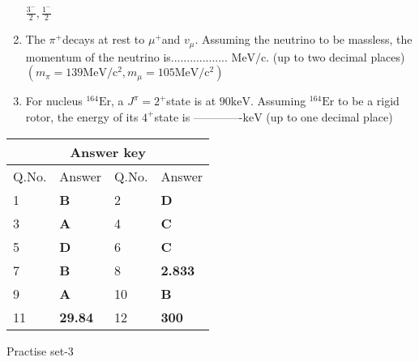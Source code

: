 \begin{enumerate}
\begin{tasks}
		\task[\textbf{D.}] $\frac{3^{-}}{2}, \frac{1^{-}}{2}$
	\end{tasks}
	\item The $\pi^{+}$decays at rest to $\mu^{+}$and $v_{\mu}$. Assuming the neutrino to be massless, the momentum of the neutrino is.................. $\mathrm{MeV} / \mathrm{c}$. (up to two decimal places)\\ $\left(m_{\pi}=139 \mathrm{MeV} / \mathrm{c}^{2}, m_{\mu}=105 \mathrm{MeV} / \mathrm{c}^{2}\right)$
	{}
	\item For nucleus ${ }^{164} \mathrm{Er}$, a $J^{\pi}=2^{+}$state is at $90 \mathrm{keV}$. Assuming ${ }^{164} \mathrm{Er}$ to be a rigid rotor, the energy of its $4^{+}$state is -------------$\mathrm{keV}$ (up to one decimal place)
	{}
\end{enumerate}
\setlength\arrayrulewidth{1pt}
\begin{table}[H]
	\centering
	\begin{tabular}{|p{1.5cm}|p{1.5cm}||p{1.5cm}|p{1.5cm}|}
		\hline
		\multicolumn{4}{|c|}{\textbf{Answer key}}\\\hline\hline
		\rowcolor{ocrel}Q.No.&Answer&Q.No.&Answer\\\hline
		1&\textbf{B} &2&\textbf{D}\\\hline 
		3&\textbf{A} &4&\textbf{C} \\\hline
		5&\textbf{D} &6&\textbf{C} \\\hline
		7&\textbf{B}&8&\textbf{2.833}\\\hline
		9&\textbf{A}&10&\textbf{B}\\\hline
		11&\textbf{29.84} &12&\textbf{300}\\\hline
	\end{tabular}
\end{table}


\newpage

\begin{abox}
	Practise set-3
 \end{abox}


